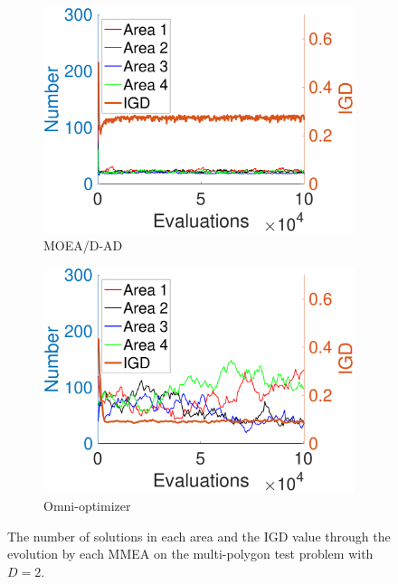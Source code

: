 \documentclass[conference]{IEEEtran}
\begin{document}
\begin{figure}[htbp]
    \begin{subfigure}[b]{.24\textwidth}
    \includegraphics[width=\linewidth]{Section5/dim2/Diversity/MOEADAD}
    \caption{MOEA/D-AD}
    \end{subfigure}
    \begin{subfigure}[b]{.24\textwidth}
    \includegraphics[width=\linewidth]{Section5/dim2/Diversity/OmniOptimizer}
    \caption{Omni-optimizer}
    \end{subfigure}
    \caption{The number of solutions in each area and the IGD value through the evolution by each MMEA on the multi-polygon test problem with $D=2$.}
    \label{fig: MMEAs Diversity dim=2}
\end{figure}
\end{document}

